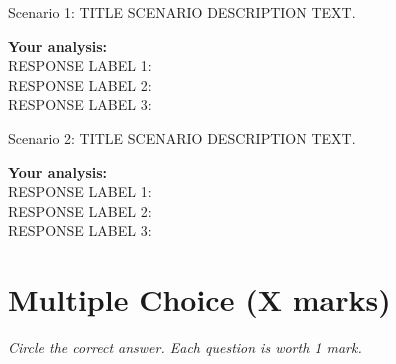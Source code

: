 \vspace{0.8em}

\begin{scenario}{Scenario 1: TITLE}
    SCENARIO DESCRIPTION TEXT.
\end{scenario}

\vspace{0.5em}
\textbf{Your analysis:}\\
RESPONSE LABEL 1: \dotfill \\[0.4em]
RESPONSE LABEL 2: \dotfill \\[0.4em]
RESPONSE LABEL 3: \dotfill

\vspace{1em}

\begin{scenario}{Scenario 2: TITLE}
    SCENARIO DESCRIPTION TEXT.
\end{scenario}

\vspace{0.5em}
\textbf{Your analysis:}\\
RESPONSE LABEL 1: \dotfill \\[0.4em]
RESPONSE LABEL 2: \dotfill \\[0.4em]
RESPONSE LABEL 3: \dotfill

\newpage

\section*{Multiple Choice (X marks)}

\textit{Circle the correct answer. Each question is worth 1 mark.}

\vspace{0.5em}

